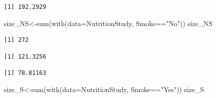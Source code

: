 \documentclass[
  letterpaper,
  DIV=11,
  numbers=noendperiod]{scrartcl}
\newenvironment{Shaded}{\begin{snugshade}}{\end{snugshade}}
\newcommand{\AttributeTok}[1]{\textcolor[rgb]{0.40,0.45,0.13}{#1}}
\newcommand{\FunctionTok}[1]{\textcolor[rgb]{0.28,0.35,0.67}{#1}}
\newcommand{\NormalTok}[1]{\textcolor[rgb]{0.00,0.23,0.31}{#1}}
\newcommand{\OtherTok}[1]{\textcolor[rgb]{0.00,0.23,0.31}{#1}}
\newcommand{\SpecialCharTok}[1]{\textcolor[rgb]{0.37,0.37,0.37}{#1}}
\newcommand{\StringTok}[1]{\textcolor[rgb]{0.13,0.47,0.30}{#1}}
\begin{document}
\begin{verbatim}
[1] 192.2929
\end{verbatim}

\begin{Shaded}
\begin{Highlighting}[]
\NormalTok{size\_NS}\OtherTok{\textless{}{-}}\FunctionTok{sum}\NormalTok{(}\FunctionTok{with}\NormalTok{(}\AttributeTok{data=}\NormalTok{NutritionStudy, Smoke}\SpecialCharTok{==}\StringTok{"No"}\NormalTok{))}
\NormalTok{size\_NS}
\end{Highlighting}
\end{Shaded}

\begin{verbatim}
[1] 272
\end{verbatim}

\begin{Shaded}
\end{Shaded}

\begin{verbatim}
[1] 121.3256
\end{verbatim}

\begin{Shaded}
\end{Shaded}

\begin{verbatim}
[1] 78.81163
\end{verbatim}

\begin{Shaded}
\begin{Highlighting}[]
\NormalTok{size\_S}\OtherTok{\textless{}{-}}\FunctionTok{sum}\NormalTok{(}\FunctionTok{with}\NormalTok{(}\AttributeTok{data=}\NormalTok{NutritionStudy, Smoke}\SpecialCharTok{==}\StringTok{"Yes"}\NormalTok{))}
\NormalTok{size\_S}
\end{Highlighting}
\end{Shaded}
\end{document}
